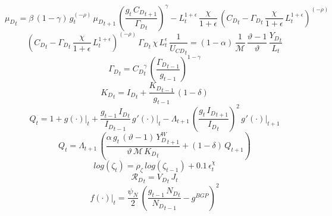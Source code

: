 \documentclass[10pt,a4paper]{article}
\begin{document}
\begin{dmath}
{{\mu}_{D}}_{t}=\beta\, \left(1-\gamma\right)\, {g}_{t}^{\left(-\rho\right)}\, {{\mu}_{D}}_{t+1}\, \left(\frac{{g}_{t}\, {C_D}_{t+1}}{{\Gamma_D}_{t}}\right)^{\gamma}-{L}_{t}^{1+\epsilon}\, \frac{\chi}{1+\epsilon}\, \left({C_D}_{t}-{\Gamma_D}_{t}\, \frac{\chi}{1+\epsilon}\, {L}_{t}^{1+\epsilon}\right)^{\left(-\rho\right)}
\end{dmath}
\begin{dmath}
\left({C_D}_{t}-{\Gamma_D}_{t}\, \frac{\chi}{1+\epsilon}\, {L}_{t}^{1+\epsilon}\right)^{\left(-\rho\right)}\, {\Gamma_D}_{t}\, \chi\, {L}_{t}^{\epsilon}\, \frac{1}{{U_{CD}}_{t}}=\left(1-\alpha\right)\, \frac{1}{\mathcal{M}}\, \frac{\vartheta-1}{\vartheta}\, \frac{{Y_D}_{t}}{{L}_{t}}
\end{dmath}
\begin{dmath}
{\Gamma_D}_{t}={C_D}_{t}^{\gamma}\, \left(\frac{{\Gamma_D}_{t-1}}{{g}_{t-1}}\right)^{1-\gamma}
\end{dmath}
\begin{dmath}
{K_D}_{t}={I_D}_{t}+\frac{{K_D}_{t-1}}{{g}_{t-1}}\, \left(1-\delta\right)
\end{dmath}
\begin{dmath}
{Q}_{t}=1+{\left.       g\left( \cdot \right)            \right|}_{t}+\frac{{g}_{t-1}\, {I_D}_{t}}{{I_D}_{t-1}}\, {\left.       g^‎{\prime}\left( \cdot \right)   \right|}_{t}-{\Lambda}_{t+1}\, \left(\frac{{g}_{t}\, {I_D}_{t+1}}{{I_D}_{t}}\right)^{2}\, {\left.       g^‎{\prime}\left( \cdot \right)   \right|}_{t+1}
\end{dmath}
\begin{dmath}
{Q}_{t}={\Lambda}_{t+1}\, \left(\frac{\alpha\, {g}_{t}\, \left(\vartheta-1\right)\, {Y^W_D}_{t+1}}{\vartheta\, \mathcal{M}\, {K_D}_{t}}+\left(1-\delta\right)\, {Q}_{t+1}\right)
\end{dmath}
\begin{dmath}
log\left({\zeta}_{t}\right)={\rho}_{\zeta}\, log\left({\zeta}_{t-1}\right)+0.1\, {\epsilon}^{\chi}_{t}
\end{dmath}
\begin{dmath}
{\mathcal{R}_{D}}_{t}={V_D}_{t}\, {J}_{t}
\end{dmath}
\begin{dmath}
{\left.       f\left( \cdot \right)            \right|}_{t}=\frac{\psi_N}{2}\, \left(\frac{{g}_{t-1}\, {N_D}_{t}}{{N_D}_{t-1}}-g^{BGP}\right)^{2}
\end{dmath}
\end{document}
